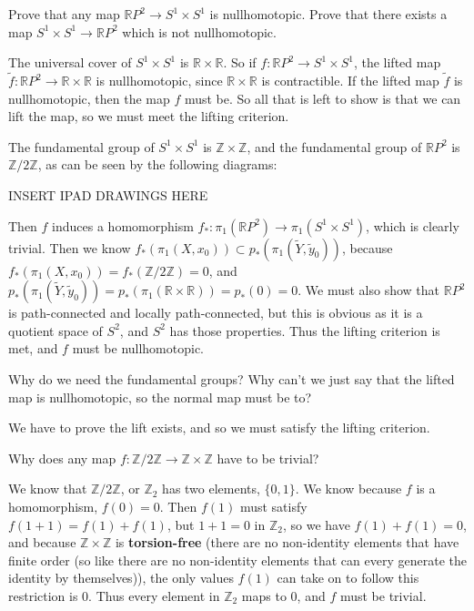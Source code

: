 \documentclass[12pt]{article}
\newcommand{\R}{\mathbb{R}}
\newcommand{\Z}{\mathbb{Z}}
\begin{document}
\begin{statement}
  Prove that any map $\R P^2 \to S^1 \times S^1$ is nullhomotopic. Prove that there exists a map $S^1 \times S^1 \to \R P^2$ which 
  is not nullhomotopic.
\end{statement}
\begin{newproof}
  The universal cover of $S^1 \times S^1$ is $\R \times \R$. So if $f:\R P^2 \to S^1 \times S^1$, the lifted map $\tilde{f}: \R P^2 \to \R 
  \times \R$ is nullhomotopic, since $\R \times \R$ is contractible. If the lifted map $\tilde{f}$ is nullhomotopic,
  then the map $f$ must be. So all that is left to show is that we can lift the map, so we must meet the lifting 
  criterion.
  \par The fundamental group of $S^1 \times S^1$ is $\Z \times \Z$, and the fundamental group of $\R P^2$ is $\Z / 2 \Z$, 
  as can be seen by the following diagrams:
  \par INSERT IPAD DRAWINGS HERE
  \par Then $f$ induces a homomorphism $f_*: \pi_1(\R P^2) \to \pi_1(S^1 \times S^1)$, which is clearly trivial. 
  Then we know $f_*(\pi_1(X,x_0)) \subset p_*(\pi_1(\tilde{Y},\tilde{y}_0))$, because $f_*(\pi_1(X,x_0))=f_*(\Z / 2\Z)=0$, and
  $p_*(\pi_1(\tilde{Y},\tilde{y}_0))=p_*(\pi_1(\R \times \R))=p_*(0)=0$. We must also show that $\R P^2$ is path-connected 
  and locally path-connected, but this is obvious as it is a quotient space of $S^2$, and $S^2$ has those properties.
  Thus the lifting criterion is met, 
  and $f$ must be nullhomotopic.
\end{newproof}
\begin{aq}
  Why do we need the fundamental groups? Why can't we just say that the lifted map is nullhomotopic, so the 
  normal map must be to?
\end{aq}
\begin{answer}
  We have to prove the lift exists, and so we must satisfy the lifting criterion.
\end{answer}
\begin{aq}
  Why does any map $f: \Z / 2\Z \to \Z \times \Z$ have to be trivial?
\end{aq}
\begin{answer}
  We know that $\Z / 2 \Z$, or $\Z_2$ has two elements, $\{0,1\}$. We know because $f$ is a homomorphism,
  $f(0)=0$. Then $f(1)$ must satisfy $f(1 + 1) = f(1) + f(1)$, but $1+1=0$ in $\Z_2$, so we have 
  $f(1) + f(1) = 0$, and because $\Z \times \Z$ is \textbf{torsion-free} (there are no non-identity elements that have 
  finite order (so like there are no non-identity elements that can every generate the identity by themselves)),
  the only values $f(1)$ can take on to follow this restriction is 0. Thus every element in $\Z_2$ maps to 0, and 
  $f$ must be trivial.
\end{answer}
\end{document}

